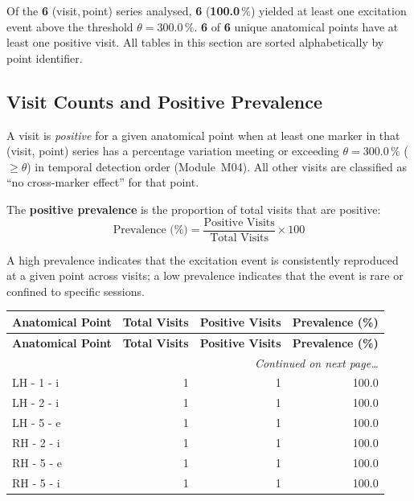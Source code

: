 \documentclass[a4paper,11pt]{article}
\begin{document}
\noindent
Of the \textbf{6} (visit,\,point) series analysed,
\textbf{6} (\textbf{100.0}\,\%) yielded at least one
excitation event above the threshold $\theta = 300.0\,\%$.
\textbf{6} of \textbf{6} unique anatomical points
have at least one positive visit.
All tables in this section are sorted alphabetically by point identifier.

\subsection{Visit Counts and Positive Prevalence}

A visit is \emph{positive} for a given anatomical point when at least one marker in that
(visit, point) series has a percentage variation meeting or exceeding
$\theta = 300.0\,\%$ ($\geq \theta$) in temporal detection order (Module~M04).
All other visits are classified as ``no cross-marker effect'' for that point.

The \textbf{positive prevalence} is the proportion of total visits that are positive:
\[
  \text{Prevalence (\%)} = \frac{\text{Positive Visits}}{\text{Total Visits}} \times 100
\]

A high prevalence indicates that the excitation event is consistently reproduced at a given
point across visits; a low prevalence indicates that the event is rare or confined to
specific sessions.

\begin{small}
\begin{longtable}{p{5cm}rrr}
\toprule
\textbf{Anatomical Point} &
\textbf{Total Visits} &
\textbf{Positive Visits} &
\textbf{Prevalence (\%)} \\
\midrule
\endfirsthead
\toprule
\textbf{Anatomical Point} &
\textbf{Total Visits} &
\textbf{Positive Visits} &
\textbf{Prevalence (\%)} \\
\midrule
\endhead
\midrule
\multicolumn{4}{r}{\small\emph{Continued on next page\ldots}} \\
\endfoot
\bottomrule
\endlastfoot
LH - 1 - i & 1 & 1 & 100.0 \\
LH - 2 - i & 1 & 1 & 100.0 \\
LH - 5 - e & 1 & 1 & 100.0 \\
RH - 2 - i & 1 & 1 & 100.0 \\
RH - 5 - e & 1 & 1 & 100.0 \\
RH - 5 - i & 1 & 1 & 100.0 \\
\end{longtable}
\end{small}
\end{document}
